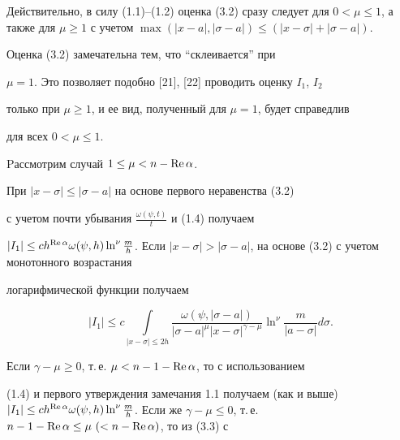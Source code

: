 \begin{pf}
\begin{equation}
\end{equation}


Действительно, в силу (1.1)--(1.2) оценка (3.2) сразу следует для $0<\mu


\le 1$, а также для $\mu \ge 1$ с учетом $\max(|x-a|,|\sigma-a|)\le (|x-


\sigma|+|\sigma-a|)$.





\begin{notes}


Оценка (3.2) замечательна тем, что ``склеивается'' при


$\mu=1$. Это позволяет подобно [21], [22] проводить оценку $I_1$, $I_2$


только при $\mu \ge 1$, и ее вид, полученный для $\mu=1$, будет справедлив


для всех $0<\mu \le 1$.


\end{notes}





Pассмотрим случай $1 \le \mu < n-\operatorname{Re} \alpha$.


При $|x-\sigma| \le |\sigma-a|$ на основе первого неравенства (3.2)


с учетом почти убывания $\frac{\omega(\psi,t)}{t}$ и (1.4) получаем


$|I_1| \le c h^{\re \alpha} \omega(\psi,h) \ln^\nu \frac{m}{h}$. Если $|x-


\sigma| > |\sigma-a|$, на основе (3.2) с учетом монотонного возрастания


логарифмической функции получаем


\begin{equation}


|I_1| \leq c \int \limits_{|x-\sigma|\le 2h} \frac{\omega(\psi,


|\sigma-a|)}{|\sigma-a|^\mu |x-\sigma|^{\gamma-\mu}} \ln^\nu \frac{m}{|a-


\sigma|} d\sigma.


\end{equation}


Если $\gamma-\mu \ge 0$, т.\,е. $\mu < n-1-\operatorname{Re} \alpha$, то с использованием


(1.4) и первого утверждения замечания 1.1 получаем (как и выше) $|I_1| \le c


h^{\re \alpha} \omega(\psi,h) \ln^\nu \frac{m}{h}$. Если же $\gamma-\mu


\le 0$, т.\,е. $n-1 -\re \alpha \le \mu \ (< n-\re \alpha)$, то из (3.3) с



\end{pf}
